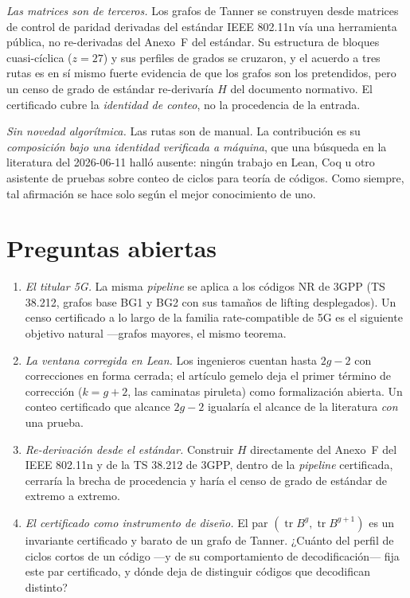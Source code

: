 \documentclass[11pt]{article}
\DeclareMathOperator{\tr}{tr}
\begin{document}
\emph{Las matrices son de terceros.} Los grafos de Tanner se construyen desde matrices de
control de paridad derivadas del estándar IEEE 802.11n vía una herramienta pública, no
re-derivadas del Anexo~F del estándar. Su estructura de bloques cuasi-cíclica ($z = 27$) y sus
perfiles de grados se cruzaron, y el acuerdo a tres rutas es en sí mismo fuerte evidencia de
que los grafos son los pretendidos, pero un censo de grado de estándar re-derivaría $H$ del
documento normativo. El certificado cubre la \emph{identidad de conteo}, no la procedencia de
la entrada.

\emph{Sin novedad algorítmica.} Las rutas son de manual. La contribución es su
\emph{composición bajo una identidad verificada a máquina}, que una búsqueda en la literatura
del 2026-06-11 halló ausente: ningún trabajo en Lean, Coq u otro asistente de pruebas sobre
conteo de ciclos para teoría de códigos. Como siempre, tal afirmación se hace solo según el
mejor conocimiento de uno.

\section{Preguntas abiertas}
\label{sec:questions}

\begin{enumerate}
\item \emph{El titular 5G.} La misma \emph{pipeline} se aplica a los códigos NR de 3GPP
(TS 38.212, grafos base BG1 y BG2 con sus tamaños de lifting desplegados). Un censo
certificado a lo largo de la familia rate-compatible de 5G es el siguiente objetivo natural
---grafos mayores, el mismo teorema.
\item \emph{La ventana corregida en Lean.} Los ingenieros cuentan hasta $2g-2$ con
correcciones en forma cerrada; el artículo gemelo deja el primer término de corrección
($k = g+2$, las caminatas piruleta) como formalización abierta. Un conteo certificado que
alcance $2g-2$ igualaría el alcance de la literatura \emph{con} una prueba.
\item \emph{Re-derivación desde el estándar.} Construir $H$ directamente del Anexo~F del
IEEE 802.11n y de la TS 38.212 de 3GPP, dentro de la \emph{pipeline} certificada, cerraría la
brecha de procedencia y haría el censo de grado de estándar de extremo a extremo.
\item \emph{El certificado como instrumento de diseño.} El par $(\tr B^g, \tr B^{g+1})$ es un
invariante certificado y barato de un grafo de Tanner. ¿Cuánto del perfil de ciclos cortos de
un código ---y de su comportamiento de decodificación--- fija este par certificado, y dónde
deja de distinguir códigos que decodifican distinto?
\end{enumerate}
\end{document}
